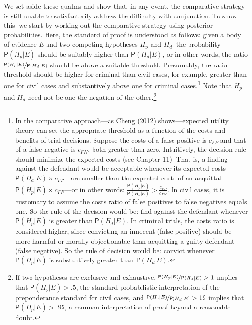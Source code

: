 \documentclass[
  10pt,
  dvipsnames,enabledeprecatedfontcommands]{scrartcl}
\newcommand{\pr}[1]{\ensuremath{\mathsf{P}(#1)}}
\begin{document}
We set aside these qualms and show that, in any event, the comparative
strategy is still unable to satisfactorily address the difficulty with
conjunction. To show this, we start by working out the comparative
strategy using posterior probabilities. Here, the standard of proof is
understood as follows: given a body of evidence \(E\) and two competing
hypotheses \(H_p\) and \(H_d\), the probability \(\pr{H_p \vert E}\)
should be suitably higher than \(\pr{H_d \vert E}\), or in other words,
the ratio \(\nicefrac{\pr{H_p \vert E}}{\pr{H_d \vert E}}\) should be
above a suitable threshold. Presumably, the ratio threshold should be
higher for criminal than civil cases, for example, greater than one for
civil cases and substantively above one for criminal cases.\footnote{In
  the comparative approach---as Cheng (2012) shows---expected utility
  theory can set the appropriate threshold as a function of the costs
  and benefits of trial decisions. Suppose the costs of a false positive
  is \(c_{FP}\) and that of a false negative is \(c_{FN}\), both greater
  than zero. Intuitively, the decision rule should minimize the expected
  costs (see Chapter 11). That is, a finding against the defendant would
  be acceptable whenever its expected
  costs---\(\pr{H_d \vert E} \times c_{FP}\)---are smaller than the
  expected costs of an
  acquittal---\(\pr{H_p \vert E}\times c_{FN}\)---or in other words:
  \(\frac{\pr{H_p \vert E}}{\pr{H_d \vert E}} > \frac{c_{FP}}{c_{FN}}\).
  In civil cases, it is customary to assume the costs ratio of false
  positives to false negatives equals one. So the rule of the decision
  would be: find against the defendant whenever \(\pr{H_p \vert E}\) is
  greater than \(\pr{H_d \vert E}\). In criminal trials, the costs ratio
  is considered higher, since convicting an innocent (false positive)
  should be more harmful or morally objectionable than acquitting a
  guilty defendant (false negative). So the rule of decision would be:
  convict whenever \(\pr{H_p \vert E}\) is substantively greater than
  \(\pr{H_d \vert E}\).} Note that \(H_p\) and \(H_d\) need not be one
the negation of the other.\footnote{If two hypotheses are exclusive and
  exhaustive, \(\nicefrac{\pr{H_p \vert E}}{\pr{H_d \vert E}}>1\)
  implies that \(\pr{H_p \vert E}>.5\), the standard probabilistic
  interpretation of the preponderance standard for civil cases, and
  \(\nicefrac{\pr{H_p \vert E}}{\pr{H_d \vert E}}>19\) implies that
  \(\pr{H_p \vert E}>.95\), a common interpretation of proof beyond a
  reasonable doubt.}
\end{document}
